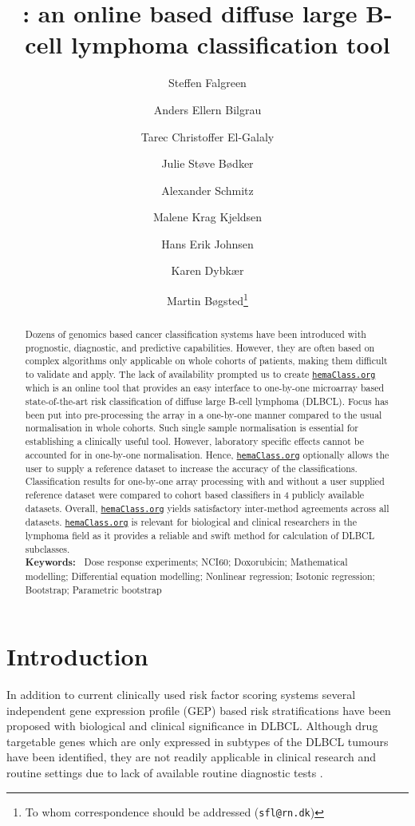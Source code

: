\documentclass{article}
\title{\hemaClass{}: an online based diffuse large B-cell lymphoma classification tool}
\author[1]{Steffen Falgreen}
\author[12]{Anders Ellern Bilgrau}
\author[1]{Tarec Christoffer El-Galaly}
\author[1]{Julie St{\o}ve  B{\o}dker}
\author[1]{Alexander Schmitz}
\author[1]{Malene Krag Kjeldsen}
\author[1]{Hans Erik Johnsen}
\author[1]{Karen Dybk{\ae}r}
\author[13]{Martin B{\o}gsted\thanks{To whom correspondence should be addressed (\texttt{sfl@rn.dk})}}
\affil[1]{Department of Haematology, Aalborg University Hospital}
\affil[2]{Department of Mathematical Sciences, Aalborg University}
\affil[3]{Department of Clinical Medicine, Aalborg University}
\newcommand{\hemaClass}{\href{http://hemaClass.org}{\texttt{hemaClass.org}}}
\begin{document}
\maketitle
{}
{}
\begin{abstract}
Dozens of genomics based cancer classification systems have been introduced with prognostic, diagnostic, and predictive capabilities.
However, they are often based on complex algorithms only applicable on whole cohorts of patients, making them difficult to validate and apply.
The lack of availability prompted us to create \hemaClass{} which is an online tool that provides an easy interface to one-by-one microarray based state-of-the-art risk classification of diffuse large B-cell lymphoma (DLBCL).
Focus has been put into pre-processing the array in a one-by-one manner compared to the usual normalisation in whole cohorts.
Such single sample normalisation is essential for establishing a clinically useful tool.
However, laboratory specific effects cannot be accounted for in one-by-one normalisation.
Hence, \hemaClass{} optionally allows the user to supply a reference dataset to increase the accuracy of the classifications.
Classification results for one-by-one array processing with and without a user supplied reference dataset were compared to cohort based classifiers in 4 publicly available datasets.
Overall, \hemaClass{} yields satisfactory inter-method agreements across all datasets.
\hemaClass{} is relevant for biological and clinical researchers in the lymphoma field as it provides a reliable and swift method for calculation of DLBCL subclasses.
\medskip\\
\textbf{Keywords:~}
Dose response experiments; NCI60; Doxorubicin; Mathematical modelling; Differential equation modelling; Nonlinear regression; Isotonic regression; Bootstrap; Parametric bootstrap
\end{abstract}



\section{Introduction}

In addition to current clinically used risk factor scoring systems several independent gene expression profile (GEP) based risk stratifications have been proposed with biological and clinical significance in DLBCL.
Although drug targetable genes which are only expressed in subtypes of the DLBCL tumours have been identified, they are not readily applicable in clinical research and routine settings due to lack of available routine diagnostic tests \citep{Jaffe2009}.
\end{document}
